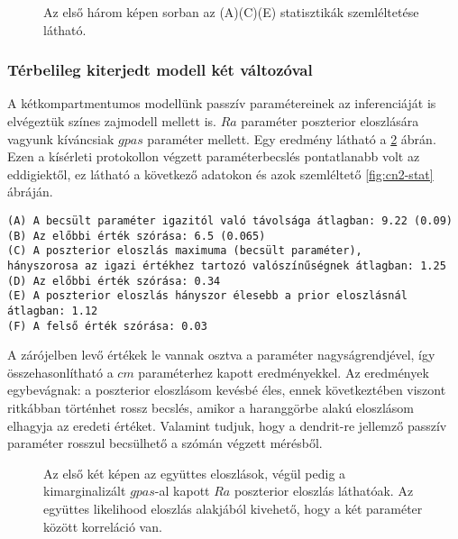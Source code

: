 \begin{figure}
	\hfill
	\hfill
	\hfill
	\vfill
	\caption[Egykompartmentumos, színes zaj, két paraméter statisztika]{Az első három képen sorban az (A)(C)(E) statisztikák szemléltetése látható.}%
	\label{fig:cn1-stat}
\end{figure}

\FloatBarrier
\subsubsection{Térbelileg kiterjedt modell két változóval}
A kétkompartmentumos modellünk passzív paramétereinek az inferenciáját is elvégeztük színes zajmodell mellett is. $Ra$ paraméter poszterior eloszlására vagyunk kíváncsiak $gpas$ paraméter mellett. Egy eredmény látható a \ref{fig:cn2} ábrán. Ezen a kísérleti protokollon végzett paraméterbecslés pontatlanabb volt az eddigiektől, ez látható a következő adatokon és azok szemléltető \ref{fig:cn2-stat} ábráján.

\begin{verbatim}
(A) A becsült paraméter igazitól való távolsága átlagban: 9.22 (0.09)
(B) Az előbbi érték szórása: 6.5 (0.065)
(C) A poszterior eloszlás maximuma (becsült paraméter), 
hányszorosa az igazi értékhez tartozó valószínűségnek átlagban: 1.25
(D) Az előbbi érték szórása: 0.34
(E) A poszterior eloszlás hányszor élesebb a prior eloszlásnál átlagban: 1.12
(F) A felső érték szórása: 0.03
\end{verbatim}

A zárójelben levő értékek le vannak osztva a paraméter nagyságrendjével, így összehasonlítható a $cm$ paraméterhez kapott eredményekkel. Az eredmények egybevágnak: a poszterior eloszlásom kevésbé éles, ennek következtében viszont ritkábban történhet rossz becslés, amikor a haranggörbe alakú eloszlásom elhagyja az eredeti értéket. Valamint tudjuk, hogy a dendrit-re jellemző passzív paraméter rosszul becsülhető a szómán végzett mérésből.

\begin{figure}
	\hfill
	\hfill
	\hfill
	\vfill
	\caption[Kétkompartmentum, színes zaj, két paraméter inferencia]{Az első két képen az együttes eloszlások, végül pedig a kimarginalizált $gpas$-al kapott $Ra$ poszterior eloszlás láthatóak. Az együttes likelihood eloszlás alakjából kivehető, hogy a két paraméter között korreláció van.}%
	\label{fig:cn2}
\end{figure}


